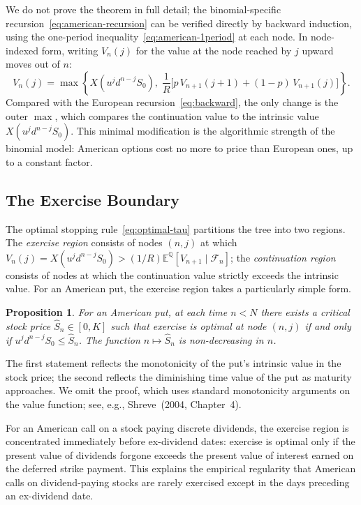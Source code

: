 \documentclass[11pt,a4paper]{article}
\theoremstyle{plain}
\newtheorem{proposition}[theorem]{Proposition}
\theoremstyle{definition}
\newcommand{\E}{\mathbb{E}}
\newcommand{\Q}{\mathbb{Q}}
\begin{document}
We do not prove the theorem in full detail; the binomial-specific
recursion~\eqref{eq:american-recursion} can be verified directly by
backward induction, using the one-period
inequality~\eqref{eq:american-1period} at each node. In node-indexed form,
writing $V_n(j)$ for the value at the node reached by $j$ upward moves
out of $n$:
\begin{equation}
    \label{eq:american-node}
    V_n(j) = \max\!\left\{
        X(u^j d^{n-j} S_0),\;
        \frac{1}{R}\bigl[ p\, V_{n+1}(j+1) + (1-p)\, V_{n+1}(j) \bigr]
    \right\}.
\end{equation}
Compared with the European recursion~\eqref{eq:backward}, the only change
is the outer $\max$, which compares the continuation value to the
intrinsic value $X(u^j d^{n-j} S_0)$. This minimal modification is the
algorithmic strength of the binomial model: American options cost no
more to price than European ones, up to a constant factor.

\subsection{The Exercise Boundary}
\label{subsec:exercise-boundary}

The optimal stopping rule~\eqref{eq:optimal-tau} partitions the tree into
two regions. The \emph{exercise region} consists of nodes $(n, j)$ at
which $V_n(j) = X(u^j d^{n-j} S_0) > (1/R)\E^{\Q}[V_{n+1} \mid \mathcal{F}_n]$;
the \emph{continuation region} consists of nodes at which the
continuation value strictly exceeds the intrinsic value. For an American
put, the exercise region takes a particularly simple form.

\begin{proposition}
\label{prop:exercise-boundary}
For an American put, at each time $n < N$ there exists a critical stock
price $\hat{S}_n \in [0, K]$ such that exercise is optimal at node
$(n, j)$ if and only if $u^j d^{n-j} S_0 \leq \hat{S}_n$. The function
$n \mapsto \hat{S}_n$ is non-decreasing in $n$.
\end{proposition}

The first statement reflects the monotonicity of the put's intrinsic
value in the stock price; the second reflects the diminishing time
value of the put as maturity approaches. We omit the proof, which uses
standard monotonicity arguments on the value function; see, e.g.,
Shreve~(2004, Chapter~4).

For an American call on a stock paying discrete dividends, the exercise
region is concentrated immediately before ex-dividend dates: exercise is
optimal only if the present value of dividends forgone exceeds the
present value of interest earned on the deferred strike payment. This
explains the empirical regularity that American calls on
dividend-paying stocks are rarely exercised except in the days
preceding an ex-dividend date.
\end{document}
